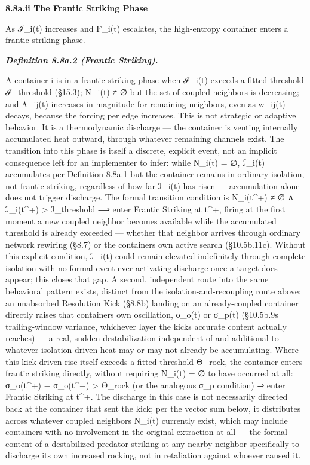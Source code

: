 \documentclass[
]{article}
\begin{document}
\textbf{8.8a.ii The Frantic Striking Phase}

As ℐ\_i(t) increases and F\_i(t) escalates, the high-entropy container
enters a frantic striking phase.

\emph{\textbf{Definition 8.8a.2 (Frantic Striking).}}

A container i is in a frantic striking phase when ℐ\_i(t) exceeds a
fitted threshold ℐ\_threshold (§15.3); N\_i(t) ≠ ∅ but the set of
coupled neighbors is decreasing; and Λ\_ij(t) increases in magnitude for
remaining neighbors, even as w\_ij(t) decays, because the forcing per
edge increases. This is not strategic or adaptive behavior. It is a
thermodynamic discharge --- the container is venting internally
accumulated heat outward, through whatever remaining channels exist. The
transition into this phase is itself a discrete, explicit event, not an
implicit consequence left for an implementer to infer: while N\_i(t) =
∅, ℐ\_i(t) accumulates per Definition 8.8a.1 but the container remains
in ordinary isolation, not frantic striking, regardless of how far
ℐ\_i(t) has risen --- accumulation alone does not trigger discharge. The
formal transition condition is N\_i(t\^{}+) ≠ ∅ ∧ ℐ\_i(t\^{}+)
\textgreater{} ℐ\_threshold ⟹ enter Frantic Striking at t\^{}+, firing
at the first moment a new coupled neighbor becomes available while the
accumulated threshold is already exceeded --- whether that neighbor
arrives through ordinary network rewiring (§8.7) or the containers own
active search (§10.5b.11c). Without this explicit condition, ℐ\_i(t)
could remain elevated indefinitely through complete isolation with no
formal event ever activating discharge once a target does appear; this
closes that gap. A second, independent route into the same behavioral
pattern exists, distinct from the isolation-and-recoupling route above:
an unabsorbed Resolution Kick (§8.8b) landing on an already-coupled
container directly raises that containers own oscillation, σ\_o(t) or
σ\_p(t) (§10.5b.9s trailing-window variance, whichever layer the kicks
accurate content actually reaches) --- a real, sudden destabilization
independent of and additional to whatever isolation-driven heat may or
may not already be accumulating. Where this kick-driven rise itself
exceeds a fitted threshold Θ\_rock, the container enters frantic
striking directly, without requiring N\_i(t) = ∅ to have occurred at
all: σ\_o(t\^{}+) − σ\_o(t\^{}−) \textgreater{} Θ\_rock (or the
analogous σ\_p condition) ⇒ enter Frantic Striking at t\^{}+. The
discharge in this case is not necessarily directed back at the container
that sent the kick; per the vector sum below, it distributes across
whatever coupled neighbors N\_i(t) currently exist, which may include
containers with no involvement in the original extraction at all --- the
formal content of a destabilized predator striking at any nearby
neighbor specifically to discharge its own increased rocking, not in
retaliation against whoever caused it.
\end{document}
